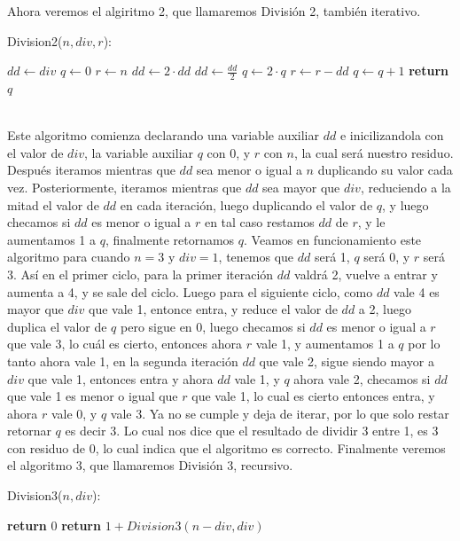 \documentclass[12pt,twoside]{article}
\begin{document}
\newpage
Ahora veremos el algiritmo 2, que llamaremos División 2, también iterativo.
\begin{algorithm}
    \caption{Division2($n,div,r$):}
    \begin{algorithmic}
        \State $dd \gets div$
        \State $q \gets 0$
        \State $r \gets n$
            \State $dd \gets 2\cdot dd$
        \EndWhile
            \State $dd \gets \frac{dd}{2}$
            \State $q \gets 2\cdot q$
                \State $r \gets r-dd$
                \State $q \gets q+1$
            \EndIf
        \EndWhile
        \State \textbf{return} $q$
    \end{algorithmic}
\end{algorithm}
\\ Este algoritmo comienza declarando una variable auxiliar $dd$ e inicilizandola con el valor de $div$, la variable auxiliar $q$ con 0, y $r$ con $n$, la cual será nuestro residuo. Después iteramos mientras que $dd$ sea menor o igual a $n$ duplicando su valor cada vez. Posteriormente, iteramos mientras que $dd$ sea mayor que $div$, reduciendo a la mitad el valor de $dd$ en cada iteración, luego duplicando el valor de $q$, y luego checamos si $dd$ es menor o igual a $r$ en tal caso restamos $dd$ de $r$, y le aumentamos 1 a $q$, finalmente retornamos $q$. Veamos en funcionamiento este algoritmo para cuando $n=3$ y $div=1$, tenemos que $dd$ será 1, $q$ será 0, y $r$ será 3. Así en el primer ciclo, para la primer iteración $dd$ valdrá 2, vuelve a entrar y aumenta a 4, y se sale del ciclo. Luego para el siguiente ciclo, como $dd$ vale 4 es mayor que $div$ que vale 1, entonce entra, y reduce el valor de $dd$ a 2, luego duplica el valor de $q$ pero sigue en 0, luego checamos si $dd$ es menor o igual a $r$ que vale 3, lo cuál es cierto, entonces ahora $r$ vale 1, y aumentamos 1 a $q$ por lo tanto ahora vale 1, en la segunda iteración $dd$ que vale 2, sigue siendo mayor a $div$ que vale 1, entonces entra y ahora $dd$ vale 1, y $q$ ahora vale 2, checamos si $dd$ que vale 1 es menor o igual que $r$ que vale 1, lo cual es cierto entonces entra, y ahora $r$ vale 0, y $q$ vale 3. Ya no se cumple y deja de iterar, por lo que solo restar retornar $q$ es decir 3. Lo cual nos dice que el resultado de dividir 3 entre 1, es 3 con residuo de 0, lo cual indica que el algoritmo es correcto.
\newpage
Finalmente veremos el algoritmo 3, que llamaremos División 3, recursivo.
\begin{algorithm}
    \caption{Division3($n,div$):}
    \begin{algorithmic}
            \State \textbf{return} $0$
        \Else
            \State \textbf{return} $1+Division3(n-div,div)$
        \EndIf
    \end{algorithmic}
\end{algorithm}
\end{document}
